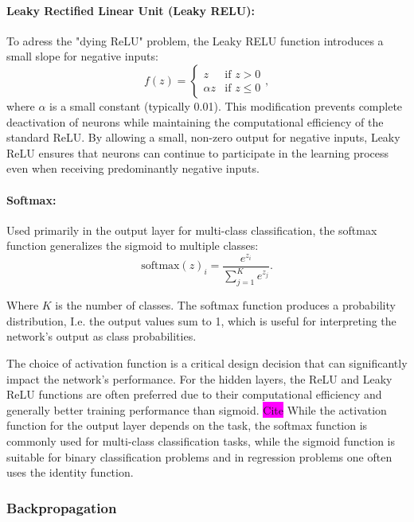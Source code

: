 \documentclass[aps,pra,english,notitlepage,reprint,nofootinbib]{revtex4-1}  %
\begin{document}
\paragraph*{Leaky Rectified Linear Unit (Leaky RELU):}
To adress the "dying ReLU" problem, the Leaky RELU function introduces a small slope for negative inputs:
\begin{equation}
     f(z) = \begin{cases} z & \text{if } z > 0 \\
\alpha z & \text{if } z \leq 0 \end{cases},
\end{equation}
where \( \alpha \) is a small constant (typically 0.01). This modification prevents complete deactivation of neurons while maintaining the computational efficiency of the standard ReLU. By allowing a small, non-zero output for negative inputs, Leaky ReLU ensures that neurons can continue to participate in the learning process even when receiving predominantly negative inputs.

\paragraph*{Softmax:}
Used primarily in the output layer for multi-class classification, the softmax function generalizes the sigmoid to multiple classes:
\begin{equation}
    \text{softmax}(z)_i = \frac{e^{z_i}}{\sum_{j=1}^{K} e^{z_j}}.
\end{equation}

Where \( K \) is the number of classes. The softmax function produces a probability distribution, I.e. the output values sum to 1, which is useful for interpreting the network's output as class probabilities.

The choice of activation function is a critical design decision that can significantly impact the network's performance. For the hidden layers, the ReLU and Leaky ReLU functions are often preferred due to their computational efficiency and generally better training performance than sigmoid. \colorbox{magenta}{Cite} While the activation function for the output layer depends on the task, the softmax function is commonly used for multi-class classification tasks, while the sigmoid function is suitable for binary classification problems and in regression problems one often uses the identity function.

\subsubsection{Backpropagation}
\end{document}
